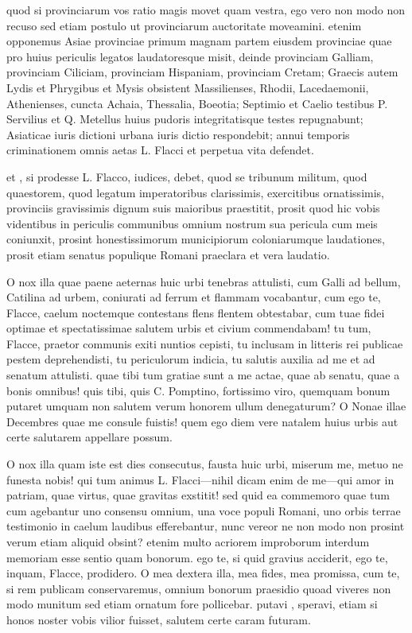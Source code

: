  quod si provinciarum vos ratio magis movet quam vestra, ego vero non modo non recuso sed etiam postulo ut provinciarum auctoritate moveamini. etenim opponemus Asiae provinciae primum magnam partem eiusdem provinciae quae pro huius periculis legatos laudatoresque misit, deinde provinciam Galliam, provinciam Ciliciam, provinciam Hispaniam, provinciam Cretam; Graecis autem Lydis et Phrygibus et Mysis obsistent Massilienses, Rhodii, Lacedaemonii, Athenienses, cuncta Achaia, Thessalia, Boeotia; Septimio et Caelio testibus P. Servilius et Q. Metellus huius pudoris integritatisque testes repugnabunt; Asiaticae iuris dictioni urbana iuris dictio respondebit; annui temporis criminationem omnis aetas L. Flacci et perpetua vita defendet.

 et , si prodesse L. Flacco, iudices, debet, quod se tribunum militum, quod quaestorem, quod legatum imperatoribus clarissimis, exercitibus ornatissimis, provinciis gravissimis dignum suis maioribus praestitit, prosit quod hic vobis videntibus in periculis communibus omnium nostrum sua pericula cum meis coniunxit, prosint honestissimorum municipiorum coloniarumque laudationes, prosit etiam senatus populique Romani praeclara et vera laudatio.

 O nox illa quae paene aeternas huic urbi tenebras attulisti, cum Galli ad bellum, Catilina ad urbem, coniurati ad ferrum et flammam vocabantur, cum ego te, Flacce, caelum noctemque contestans flens flentem obtestabar, cum tuae fidei optimae et spectatissimae salutem urbis et civium commendabam! tu tum, Flacce, praetor communis exiti nuntios cepisti, tu inclusam in litteris rei publicae pestem deprehendisti, tu periculorum indicia, tu salutis auxilia ad me et ad senatum attulisti. quae tibi tum gratiae sunt a me actae, quae ab senatu, quae a bonis omnibus! quis tibi, quis C. Pomptino, fortissimo viro, quemquam bonum putaret umquam non salutem verum honorem ullum denegaturum? O Nonae illae Decembres quae me consule fuistis! quem ego diem vere natalem huius urbis aut certe salutarem appellare possum.

 O nox illa quam iste est dies consecutus, fausta huic urbi, miserum me, metuo ne funesta nobis! qui tum animus L. Flacci—nihil dicam enim de me—qui amor in patriam, quae virtus, quae gravitas exstitit! sed quid ea commemoro quae tum cum agebantur uno consensu omnium, una voce populi Romani, uno orbis terrae testimonio in caelum laudibus efferebantur, nunc vereor ne non modo non prosint verum etiam aliquid obsint? etenim multo acriorem improborum interdum memoriam esse sentio quam bonorum. ego te, si quid gravius acciderit, ego te, inquam, Flacce, prodidero. O mea dextera illa, mea fides, mea promissa, cum te, si rem publicam conservaremus, omnium bonorum praesidio quoad viveres non modo munitum sed etiam ornatum fore pollicebar. putavi , speravi, etiam si honos noster vobis vilior fuisset, salutem certe caram futuram.

